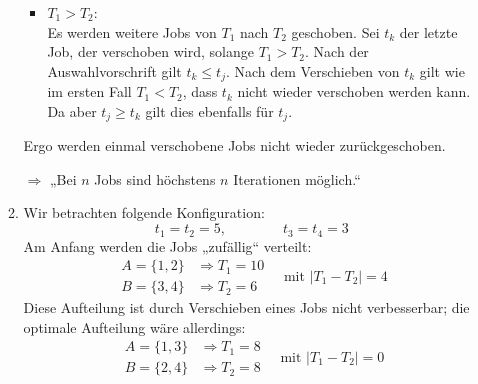 \documentclass[a4paper]{scrartcl}
\begin{document}
\begin{enumerate}[label=\bfseries \arabic*.]
\begin{enumerate}
\begin{itemize}
            \item $T_1 > T_2$: \\
                Es werden weitere Jobs von $T_1$ nach $T_2$ geschoben.
                Sei $t_k$ der letzte Job, der verschoben wird, solange
                $T_1 > T_2$.
                Nach der Auswahlvorschrift gilt $t_k \leq t_j$.
                Nach dem Verschieben von $t_k$ gilt wie im ersten Fall
                $T_1 < T_2$, dass $t_k$ nicht wieder verschoben werden kann.
                Da aber $t_j \geq t_k$ gilt dies ebenfalls für $t_j$.
        \end{itemize}
        Ergo werden einmal verschobene Jobs nicht wieder zurückgeschoben.

        $\Rightarrow$ „Bei $n$ Jobs sind höchstens $n$ Iterationen möglich.“

    \item %
        Wir betrachten folgende Konfiguration:
        \begin{equation*}
            t_1 = t_2 = 5,
            \qquad\qquad
            t_3 = t_4 = 3
        \end{equation*}
        Am Anfang werden die Jobs „zufällig“ verteilt:
        \begin{equation*}
            \begin{aligned}
                A = \{1,2\} &\Rightarrow T_1 = 10 \\
                B = \{3,4\} &\Rightarrow T_2 =  6
            \end{aligned}
            \quad \text{mit }
            |T_1 - T_2| = 4
        \end{equation*}
        Diese Aufteilung ist durch Verschieben eines Jobs nicht verbesserbar;
        die optimale Aufteilung wäre allerdings:
        \begin{equation*}
            \begin{aligned}
                A = \{1,3\} &\Rightarrow T_1 = 8 \\
                B = \{2,4\} &\Rightarrow T_2 = 8
            \end{aligned}
            \quad \text{mit }
            |T_1 - T_2| = 0
        \end{equation*}
\end{enumerate}


\end{enumerate}
\end{document}
